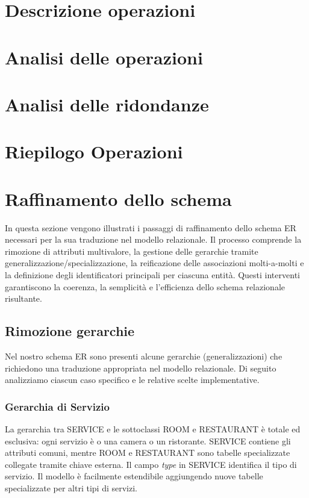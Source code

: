 \documentclass[a4paper,12pt]{report}
\begin{document}
\section{Descrizione operazioni}
\section{Analisi delle operazioni}
\section{Analisi delle ridondanze}
\section{Riepilogo Operazioni}

\section{Raffinamento dello schema}
In questa sezione vengono illustrati i passaggi di raffinamento dello
schema ER necessari per la sua traduzione nel modello relazionale. Il
processo comprende la rimozione di attributi multivalore, la gestione
delle gerarchie tramite generalizzazione/specializzazione, la
reificazione delle associazioni molti-a-molti e la definizione degli
identificatori principali per ciascuna entità. Questi interventi
garantiscono la coerenza, la semplicità e l'efficienza dello schema
relazionale risultante.

\subsection{Rimozione gerarchie}
Nel nostro schema ER sono presenti alcune gerarchie
(generalizzazioni) che richiedono una traduzione appropriata nel
modello relazionale. Di seguito analizziamo ciascun caso specifico e
le relative scelte implementative.

\subsubsection{Gerarchia di Servizio}
La gerarchia tra SERVICE e le sottoclassi ROOM e RESTAURANT è totale
ed esclusiva: ogni servizio è o una camera o un ristorante. SERVICE
contiene gli attributi comuni, mentre ROOM e RESTAURANT sono tabelle
specializzate collegate tramite chiave esterna. Il campo
\textit{type} in SERVICE identifica il tipo di servizio. Il modello è
facilmente estendibile aggiungendo nuove tabelle specializzate per
altri tipi di servizi.
\end{document}
